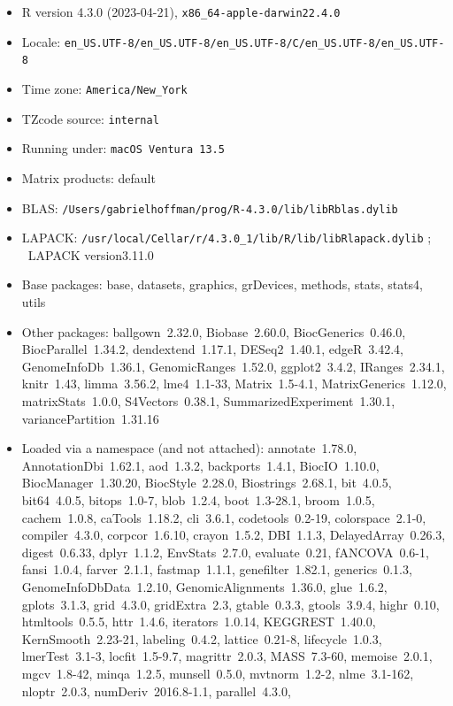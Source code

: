 \documentclass[12pt]{article}\usepackage[]{graphicx}\usepackage[]{xcolor}
\begin{document}
\begin{itemize}\raggedright
  \item R version 4.3.0 (2023-04-21), \verb|x86_64-apple-darwin22.4.0|
  \item Locale: \verb|en_US.UTF-8/en_US.UTF-8/en_US.UTF-8/C/en_US.UTF-8/en_US.UTF-8|
  \item Time zone: \verb|America/New_York|
  \item TZcode source: \verb|internal|
  \item Running under: \verb|macOS Ventura 13.5|
  \item Matrix products: default
  \item BLAS:   \verb|/Users/gabrielhoffman/prog/R-4.3.0/lib/libRblas.dylib|
  \item LAPACK: \verb|/usr/local/Cellar/r/4.3.0_1/lib/R/lib/libRlapack.dylib|
; \quad\ LAPACK version3.11.0
  \item Base packages: base, datasets, graphics, grDevices, methods,
    stats, stats4, utils
  \item Other packages: ballgown~2.32.0, Biobase~2.60.0,
    BiocGenerics~0.46.0, BiocParallel~1.34.2, dendextend~1.17.1,
    DESeq2~1.40.1, edgeR~3.42.4, GenomeInfoDb~1.36.1,
    GenomicRanges~1.52.0, ggplot2~3.4.2, IRanges~2.34.1, knitr~1.43,
    limma~3.56.2, lme4~1.1-33, Matrix~1.5-4.1, MatrixGenerics~1.12.0,
    matrixStats~1.0.0, S4Vectors~0.38.1, SummarizedExperiment~1.30.1,
    variancePartition~1.31.16
  \item Loaded via a namespace (and not attached): annotate~1.78.0,
    AnnotationDbi~1.62.1, aod~1.3.2, backports~1.4.1, BiocIO~1.10.0,
    BiocManager~1.30.20, BiocStyle~2.28.0, Biostrings~2.68.1,
    bit~4.0.5, bit64~4.0.5, bitops~1.0-7, blob~1.2.4, boot~1.3-28.1,
    broom~1.0.5, cachem~1.0.8, caTools~1.18.2, cli~3.6.1,
    codetools~0.2-19, colorspace~2.1-0, compiler~4.3.0, corpcor~1.6.10,
    crayon~1.5.2, DBI~1.1.3, DelayedArray~0.26.3, digest~0.6.33,
    dplyr~1.1.2, EnvStats~2.7.0, evaluate~0.21, fANCOVA~0.6-1,
    fansi~1.0.4, farver~2.1.1, fastmap~1.1.1, genefilter~1.82.1,
    generics~0.1.3, GenomeInfoDbData~1.2.10, GenomicAlignments~1.36.0,
    glue~1.6.2, gplots~3.1.3, grid~4.3.0, gridExtra~2.3, gtable~0.3.3,
    gtools~3.9.4, highr~0.10, htmltools~0.5.5, httr~1.4.6,
    iterators~1.0.14, KEGGREST~1.40.0, KernSmooth~2.23-21,
    labeling~0.4.2, lattice~0.21-8, lifecycle~1.0.3, lmerTest~3.1-3,
    locfit~1.5-9.7, magrittr~2.0.3, MASS~7.3-60, memoise~2.0.1,
    mgcv~1.8-42, minqa~1.2.5, munsell~0.5.0, mvtnorm~1.2-2,
    nlme~3.1-162, nloptr~2.0.3, numDeriv~2016.8-1.1, parallel~4.3.0,

\end{itemize}
\end{document}
